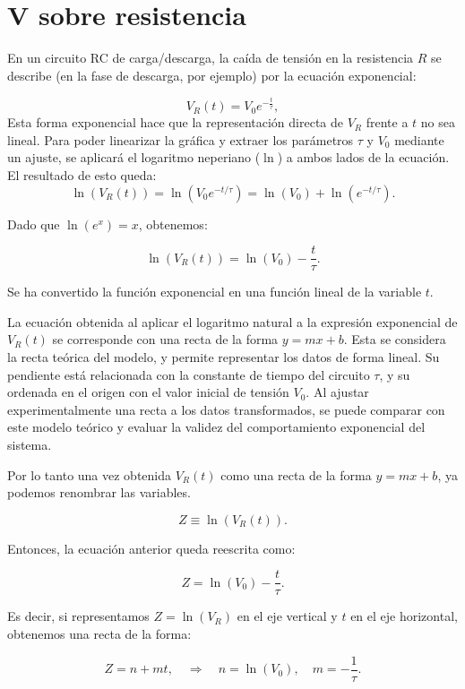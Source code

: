 \documentclass{article}
\begin{document}
\section{V sobre resistencia}
En un circuito RC de carga/descarga, la caída de tensión en la resistencia \( R \) se describe (en la fase de descarga, por ejemplo) por la ecuación exponencial:

\[
V_R(t) = V_0 e^{-\frac{t}{\tau}},
\]
Esta forma exponencial hace que la representación directa de \( V_R \) frente a \( t \) no sea lineal. Para poder linearizar la gráfica y extraer los parámetros \( \tau \) y \( V_0 \) mediante un ajuste, se aplicará el logaritmo neperiano (\( \ln \)) a ambos lados de la ecuación. El resultado de esto queda:
\[
\ln(V_R(t)) = \ln\left(V_0 e^{-t/\tau}\right) = \ln(V_0) + \ln\left(e^{-t/\tau}\right).
\]

Dado que \( \ln(e^x) = x \), obtenemos:

\[
\ln(V_R(t)) = \ln(V_0) - \frac{t}{\tau}.
\]

\noindent
Se ha convertido la función exponencial en una función lineal de la variable \( t \).

\vspace{2em}
\noindent
La ecuación obtenida al aplicar el logaritmo natural a la expresión exponencial de \( V_R(t) \) se corresponde con una recta de la forma \( y = mx + b \). Esta se considera la recta teórica del modelo, y permite representar los datos de forma lineal. Su pendiente está relacionada con la constante de tiempo del circuito \( \tau \), y su ordenada en el origen con el valor inicial de tensión \( V_0 \). Al ajustar experimentalmente una recta a los datos transformados, se puede comparar con este modelo teórico y evaluar la validez del comportamiento exponencial del sistema.

\vspace{2em}
Por lo tanto una vez obtenida \( V_R(t) \) como una recta de la forma \( y = mx + b \), ya podemos renombrar las variables.

\[
Z \equiv \ln(V_R(t)).
\]

Entonces, la ecuación anterior queda reescrita como:

\[
Z = \ln(V_0) - \frac{t}{\tau}.
\]

Es decir, si representamos \( Z = \ln(V_R) \) en el eje vertical y \( t \) en el eje horizontal, obtenemos una recta de la forma:

\[
Z = n + mt, \quad \Longrightarrow \quad n = \ln(V_0), \quad m = -\frac{1}{\tau}.
\]
\end{document}
